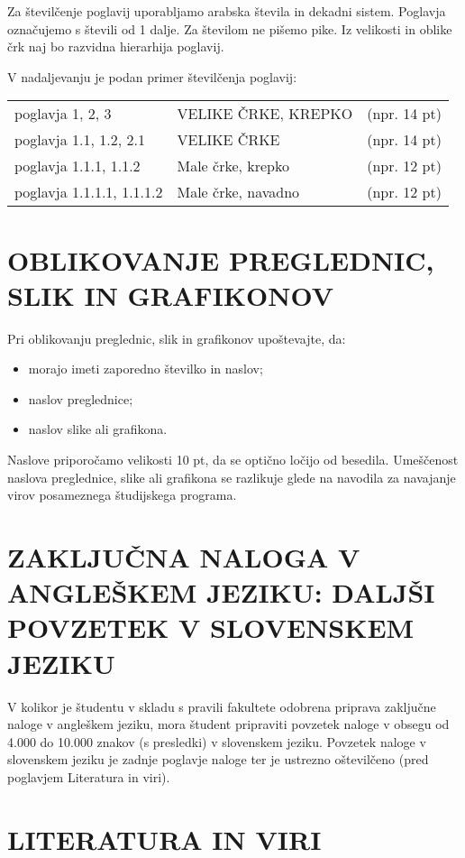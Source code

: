 Za številčenje poglavij uporabljamo arabska števila in dekadni sistem. Poglavja označujemo s števili od 1 dalje. Za številom ne pišemo pike. Iz velikosti in oblike črk naj bo razvidna hierarhija poglavij.

\medskip\noindent
V nadaljevanju je podan primer številčenja poglavij:

\bigskip\noindent
\begin{tabular}{lll}
poglavja 1, 2, 3 & \large VELIKE ČRKE, KREPKO & (npr. 14 pt) \\
poglavja 1.1, 1.2, 2.1 & \large VELIKE ČRKE & (npr. 14 pt) \\
poglavja 1.1.1, 1.1.2 & Male črke, krepko & (npr. 12 pt) \\
poglavja 1.1.1.1, 1.1.1.2 & Male črke, navadno & (npr. 12 pt)
\end{tabular}

\section{OBLIKOVANJE PREGLEDNIC, SLIK IN GRAFI\-KONOV}

Pri oblikovanju preglednic, slik in grafikonov upoštevajte, da:
\begin{itemize}
\item morajo imeti zaporedno številko in naslov;
\item naslov preglednice;
\item naslov slike ali grafikona.
\end{itemize}

Naslove priporočamo velikosti 10 pt, da se optično ločijo od besedila. Umeščenost naslova preglednice, slike ali grafikona se razlikuje glede na navodila za navajanje virov posameznega študijskega programa.

\section{ZAKLJUČNA NALOGA V ANGLEŠKEM JEZIKU: DALJŠI POVZETEK V SLOVENSKEM JEZIKU}

V kolikor je študentu v skladu s pravili fakultete odobrena priprava zaključne naloge v angleškem jeziku, mora študent pripraviti povzetek naloge v obsegu od 4.000 do 10.000 znakov (s presledki) v slovenskem jeziku. Povzetek naloge v slovenskem jeziku je zadnje poglavje naloge ter je ustrezno oštevilčeno (pred poglavjem Literatura in viri).

\section{LITERATURA IN VIRI}

